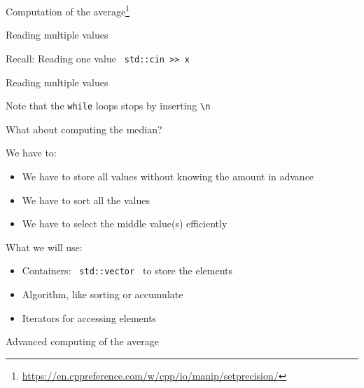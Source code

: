 \documentclass[12pt]{beamer}
\begin{document}
\begin{frame}{Computation of the average\footnote{\tiny\url{https://en.cppreference.com/w/cpp/io/manip/setprecision/}}}




\end{frame}

\begin{frame}{Reading multiple values}

\begin{block}{Recall: Reading one value}
\lstinline| std::cin >> x|
\end{block}

\begin{block}{Reading multiple values}

\end{block}

Note that the \lstinline|while| loops stops by inserting \lstinline|\n|

\end{frame}

\begin{frame}{What about computing the median?}

\begin{block}{We have to:}
\begin{itemize}
\item We have to store all values without knowing the amount in advance
\item We have to sort all the values 
\item We have to select the middle value(s) efficiently
\end{itemize}

\end{block}
\pause
\begin{block}{What we will use:}
\begin{itemize}
\item Containers: \lstinline| std::vector | to store the elements
\item Algorithm, like sorting or accumulate
\item Iterators for accessing elements
\end{itemize}

\end{block}

\end{frame}

\begin{frame}{Advanced computing of the average}



\end{frame}
\end{document}
